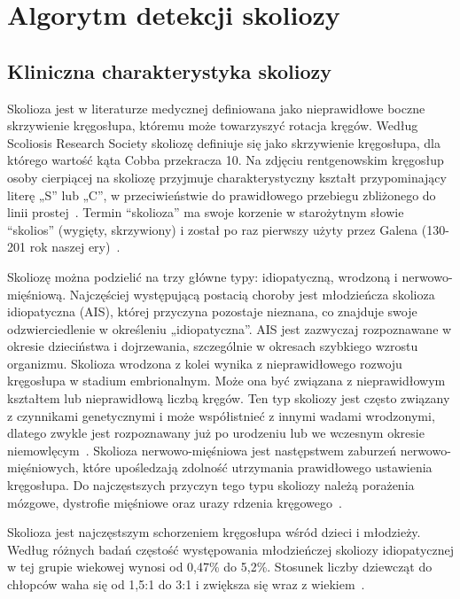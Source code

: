\chapter{Algorytm detekcji skoliozy}
\label{chap:skolioza}

\section{Kliniczna charakterystyka skoliozy}
\label{sec:klinika-skoliozy}
Skolioza jest w literaturze medycznej definiowana jako nieprawidłowe boczne skrzywienie kręgosłupa, któremu może towarzyszyć rotacja kręgów.
Według Scoliosis Research Society skoliozę definiuje się jako skrzywienie kręgosłupa, dla którego wartość kąta Cobba przekracza 10\degree{}.
Na zdjęciu rentgenowskim kręgosłup osoby cierpiącej na skoliozę przyjmuje charakterystyczny kształt przypominający literę „S” lub „C”, w przeciwieństwie do prawidłowego przebiegu zbliżonego do linii prostej~\cite{srs}.
Termin \enquote{skolioza} ma swoje korzenie w starożytnym słowie \enquote{skolios} (wygięty, skrzywiony) i został po raz pierwszy użyty przez Galena (130-201 rok naszej ery)~\cite{koniecznymr}.

Skoliozę można podzielić na trzy główne typy: idiopatyczną, wrodzoną i nerwowo-mięśniową.
Najczęściej występującą postacią choroby jest młodzieńcza skolioza idiopatyczna (AIS), której przyczyna pozostaje nieznana, co znajduje swoje odzwierciedlenie w określeniu „idiopatyczna”.
AIS jest zazwyczaj rozpoznawane w okresie dzieciństwa i dojrzewania, szczególnie w okresach szybkiego wzrostu organizmu.
Skolioza wrodzona z kolei wynika z nieprawidłowego rozwoju kręgosłupa w stadium embrionalnym. Może ona być związana z nieprawidłowym kształtem lub nieprawidłową liczbą kręgów.
Ten typ skoliozy jest często związany z czynnikami genetycznymi i może współistnieć z innymi wadami wrodzonymi, dlatego zwykle jest rozpoznawany już po urodzeniu lub we wczesnym okresie niemowlęcym~\cite{lim}.
Skolioza nerwowo-mięśniowa jest następstwem zaburzeń nerwowo-mięśniowych, które upośledzają zdolność utrzymania prawidłowego ustawienia kręgosłupa.
Do najczęstszych przyczyn tego typu skoliozy należą  porażenia mózgowe, dystrofie mięśniowe oraz urazy rdzenia kręgowego~\cite{yale}.

Skolioza jest najczęstszym schorzeniem kręgosłupa wśród dzieci i młodzieży.
Według różnych badań częstość występowania młodzieńczej skoliozy idiopatycznej  w tej grupie wiekowej wynosi od 0,47\% do 5,2\%.
Stosunek liczby dziewcząt do chłopców waha się od 1,5:1 do 3:1 i zwiększa się wraz z wiekiem~\cite{koniecznymr}.

